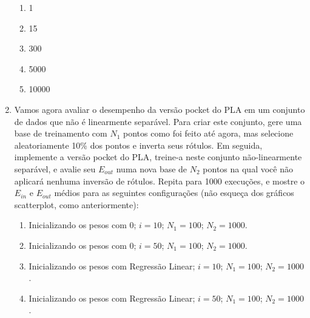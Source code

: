\begin{enumerate}
    \begin{enumerate}
        \item 1
        \item 15
        \item 300
        \item 5000
        \item 10000
    \end{enumerate}
    
    \item Vamos agora avaliar o desempenho da versão pocket do PLA em um conjunto de dados que não é linearmente separável. Para criar este conjunto, gere uma base de treinamento com $N_1$ pontos como foi feito até agora, mas selecione aleatoriamente 10\% dos pontos e inverta seus rótulos. Em seguida, implemente a versão pocket do PLA, treine-a neste conjunto não-linearmente separável, e avalie seu $E_{out}$ numa nova base de $N_2$ pontos na qual você não aplicará nenhuma inversão de rótulos. Repita para 1000 execuções, e mostre o $E_{in}$ e $E_{out}$ médios para as seguintes configurações (não esqueça dos gráficos scatterplot, como anteriormente):
    
    \begin{enumerate}
        \item Inicializando os pesos com 0; $i = 10$; $N_1 = 100$; $N_2 = 1000$.
        \item Inicializando os pesos com 0; $i = 50$; $N_1 = 100$; $N_2 = 1000$.
        \item Inicializando os pesos com Regressão Linear; $i = 10$; $N_1 = 100$; $N_2 = 1000$.
        \item Inicializando os pesos com Regressão Linear; $i = 50$; $N_1 = 100$; $N_2 = 1000$.
    \end{enumerate}

    
\end{enumerate}